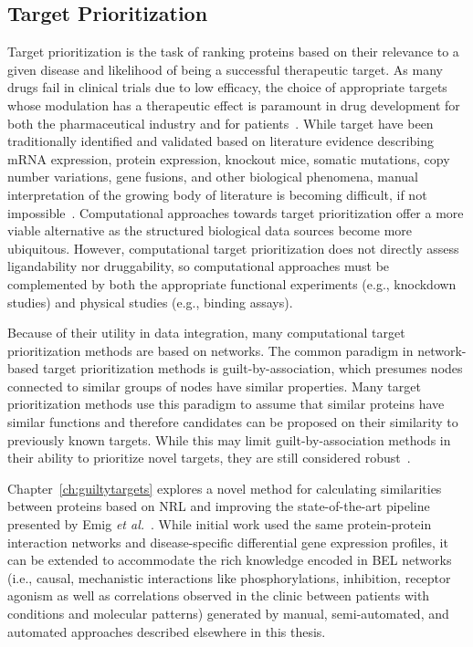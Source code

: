 \subsection{Target Prioritization}

Target prioritization is the task of ranking proteins based on their relevance to a given disease and likelihood of being a successful therapeutic target.
As many drugs fail in clinical trials due to low efficacy, the choice of appropriate targets whose modulation has a therapeutic effect is paramount in drug development for both the pharmaceutical industry and for patients~\cite{Arrowsmith2011,Arrowsmith2011a}.
While target have been traditionally identified and validated based on literature evidence describing mRNA expression, protein expression, knockout mice, somatic mutations, copy number variations, gene fusions, and other biological phenomena, manual interpretation of the growing body of literature is becoming difficult, if not impossible~\cite{Gashaw2012,Isik2015,Moseley2007}.
Computational approaches towards target prioritization offer a more viable alternative as the structured biological data sources become more ubiquitous.
However, computational target prioritization does not directly assess ligandability nor druggability, so computational approaches must be complemented by both the appropriate functional experiments (e.g., knockdown studies) and physical studies (e.g., binding assays).

Because of their utility in data integration, many computational target prioritization methods are based on networks.
The common paradigm in network-based target prioritization methods is guilt-by-association, which presumes nodes connected to similar groups of nodes have similar properties.
Many target prioritization methods use this paradigm to assume that similar proteins have similar functions and therefore candidates can be proposed on their similarity to previously known targets.
While this may limit guilt-by-association methods in their ability to prioritize novel targets, they are still considered robust~\cite{Moreau2012}.

Chapter~\ref{ch:guiltytargets} explores a novel method for calculating similarities between proteins based on \ac{NRL} and improving the state-of-the-art pipeline presented by Emig \textit{et al.}~\cite{Emig2013}.
While initial work used the same protein-protein interaction networks and disease-specific differential gene expression profiles, it can be extended to accommodate the rich knowledge encoded in \ac{BEL} networks (i.e., causal, mechanistic interactions like phosphorylations, inhibition, receptor agonism as well as correlations observed in the clinic between patients with conditions and molecular patterns) generated by manual, semi-automated, and automated approaches described elsewhere in this thesis.

